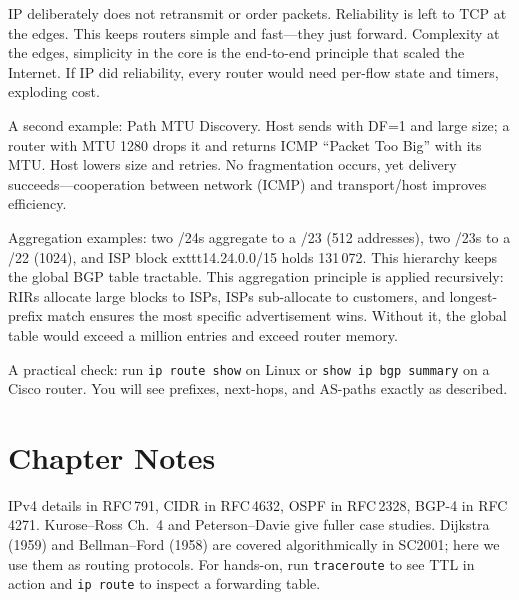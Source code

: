\begin{remark}
IP deliberately does not retransmit or order packets. Reliability is left to TCP at the edges.
This keeps routers simple and fast---they just forward. Complexity at the edges, simplicity in the core is the end-to-end principle that scaled the Internet.
If IP did reliability, every router would need per-flow state and timers, exploding cost.
\end{remark}

A second example: Path MTU Discovery. Host sends with DF=1 and large size;
a router with MTU 1280 drops it and returns ICMP ``Packet Too Big''
with its MTU. Host lowers size and retries.
No fragmentation occurs, yet delivery succeeds---cooperation
between network (ICMP) and transport/host improves efficiency.

Aggregation examples: two /24s aggregate to a /23 (512 addresses), two /23s to a /22 (1024), and ISP block 	exttt{14.24.0.0/15} holds 131\,072. This hierarchy keeps the global BGP table tractable.
This aggregation principle is applied recursively: RIRs allocate large blocks to ISPs, ISPs sub-allocate to customers, and longest-prefix match ensures the most specific advertisement wins. Without it, the global table would exceed a million entries and exceed router memory.

A practical check: run \texttt{ip route show} on Linux or \texttt{show ip bgp summary} on a Cisco router. You will see prefixes, next-hops, and AS-paths exactly as described.


\section{Chapter Notes}
IPv4 details in RFC\,791, CIDR in RFC\,4632, OSPF in RFC\,2328, BGP-4 in RFC\,4271. Kurose--Ross Ch.~4 and Peterson--Davie give fuller case studies. Dijkstra (1959) and Bellman--Ford (1958) are covered algorithmically in SC2001; here we use them as routing protocols. For hands-on, run \texttt{traceroute} to see TTL in action and \texttt{ip route} to inspect a forwarding table.
